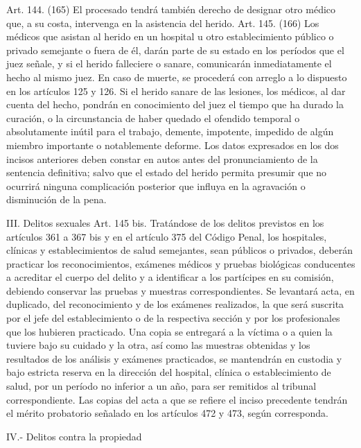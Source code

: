     Art. 144. (165) El procesado tendrá también derecho de designar otro médico que, a su costa, intervenga en la asistencia del herido.
    Art. 145. (166) Los médicos que asistan al herido en un hospital u otro establecimiento público o privado semejante o fuera de él, darán parte de su estado en los períodos que el juez señale, y si el herido falleciere o sanare, comunicarán inmediatamente el hecho al mismo juez.
    En caso de muerte, se procederá con arreglo a lo dispuesto en los artículos 125 y 126.
    Si el herido sanare de las lesiones, los médicos, al dar cuenta del hecho, pondrán en conocimiento del juez el tiempo que ha durado la curación, o la circunstancia de haber quedado el ofendido temporal o absolutamente inútil para el trabajo, demente, impotente, impedido de algún miembro importante o notablemente deforme.
    Los datos expresados en los dos incisos anteriores deben constar en autos antes del pronunciamiento de la sentencia definitiva; salvo que el estado del herido permita presumir que no ocurrirá ninguna complicación posterior que influya en la agravación o disminución de la pena.

    III. Delitos sexuales
    Art. 145 bis. Tratándose de los delitos previstos en los artículos 361 a 367 bis y en el artículo 375 del Código Penal, los hospitales, clínicas y establecimientos de salud semejantes, sean públicos o privados, deberán practicar los reconocimientos, exámenes médicos y pruebas biológicas conducentes a acreditar el cuerpo del delito y a identificar a los partícipes en su comisión, debiendo conservar las pruebas y muestras correspondientes.
    Se levantará acta, en duplicado, del reconocimiento y de los exámenes realizados, la que será suscrita por el jefe del establecimiento o de la respectiva sección y por los profesionales que los hubieren practicado. Una copia se entregará a la víctima o a quien la tuviere bajo su cuidado y la otra, así como las muestras obtenidas y los resultados de los análisis y exámenes practicados, se mantendrán en custodia y bajo estricta reserva en la dirección del hospital, clínica o establecimiento de salud, por un período no inferior a un año, para ser remitidos al tribunal correspondiente.
    Las copias del acta a que se refiere el inciso precedente tendrán el mérito probatorio señalado en los artículos 472 y 473, según corresponda.

    IV.- Delitos contra la propiedad

